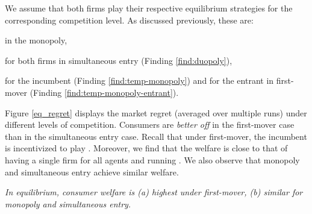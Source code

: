 \documentclass[../competing_bandits_with_appendix.tex]{subfiles}
\begin{document}
We assume that both firms play their respective equilibrium strategies for the corresponding competition level. As discussed previously, these are:
\begin{OneLiners}
\item \DynamicGreedy in the monopoly,
\item \DynamicGreedy for both firms in simultaneous entry (Finding \ref{find:duopoly}),
\item \Thompson for the incumbent (Finding \ref{find:temp-monopoly}) and \DynamicGreedy for the entrant in first-mover (Finding \ref{find:temp-monopoly-entrant}).
\end{OneLiners}

Figure \ref{eq_regret} displays the market regret (averaged
  over multiple runs) under different levels of competition.
Consumers are \textit{better off} in the first-mover case than in
the simultaneous entry case. Recall that under first-mover, the incumbent is incentivized to play \Thompson. Moreover, we find that the welfare is close to that of having a single firm for all agents and running \Thompson. We also observe that monopoly and simultaneous entry achieve similar welfare.

\begin{finding}\label{find:welfare}
\textit{In equilibrium, consumer welfare is (a) highest under first-mover, (b) similar for monopoly and simultaneous entry.
}
\end{finding}
\end{document}
